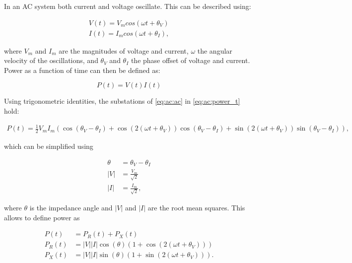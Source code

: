 In an AC system both current and voltage oscillate. This can be described using:

\begin{equation}
    \begin{split}
    V(t) = V_m cos(\omega t + \theta_V)\\
    I(t) = I_m cos(\omega t + \theta_I),
    \end{split}
\label{eq:ac:ac}
\end{equation}

where $V_m$ and $I_m$ are the magnitudes of voltage and current,
$\omega$ the angular velocity of the oscillations, and $\theta_V$ and $\theta_I$
the phase offset of voltage and current.\\
Power as a function of time can then be defined as:

\begin{equation}
    P(t) = V(t)I(t)
    \label{eq:ac:power_t}
\end{equation}

Using trigonometric identities, the substations of \autoref{eq:ac:ac} in \autoref{eq:ac:power_t} hold:

\begin{equation}
    \begin{aligned}
        P(t) = \frac{1}{2} V_m I_m (\cos (\theta_V-\theta_I) 
        + \cos(2(\omega t + \theta_V))\cos(\theta_V-\theta_I)
        + \sin(2(\omega t + \theta_V))\sin(\theta_V-\theta_I)),
    \end{aligned}
    \label{eq:ac:power_ac_long}
\end{equation}

which can be simplified using

\begin{equation}
    \begin{aligned}
        \theta  &= \theta_V - \theta_I \\
        |V|     &= \frac{V_m}{\sqrt{2}} \\
        |I|     &= \frac{I_m}{\sqrt{2}},
    \end{aligned}
    \label{eq:ac:power_def}
\end{equation}

where $\theta$ is the impedance angle and $|V|$ and $|I|$ are the root mean squares.
This allows to define power as
         
\begin{equation}
    \begin{aligned}
        P(t)   &= P_R(t) + P_X(t)\\
        P_R(t) &= |V||I| \cos(\theta) (1 + \cos(2(\omega t+\theta_V)))\\
        P_X(t) &= |V||I| \sin(\theta) (1 + \sin(2(\omega t+\theta_V))).
    \end{aligned}
    \label{eq:ac:power_react_and_capacitive}
\end{equation}

